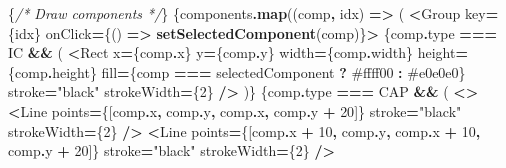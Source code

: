 \documentclass[
]{article}
\newenvironment{Shaded}{\begin{snugshade}}{\end{snugshade}}
\newcommand{\AttributeTok}[1]{\textcolor[rgb]{0.13,0.29,0.53}{#1}}
\newcommand{\CommentTok}[1]{\textcolor[rgb]{0.56,0.35,0.01}{\textit{#1}}}
\newcommand{\DecValTok}[1]{\textcolor[rgb]{0.00,0.00,0.81}{#1}}
\newcommand{\FunctionTok}[1]{\textcolor[rgb]{0.13,0.29,0.53}{\textbf{#1}}}
\newcommand{\KeywordTok}[1]{\textcolor[rgb]{0.13,0.29,0.53}{\textbf{#1}}}
\newcommand{\NormalTok}[1]{#1}
\newcommand{\OperatorTok}[1]{\textcolor[rgb]{0.81,0.36,0.00}{\textbf{#1}}}
\newcommand{\StringTok}[1]{\textcolor[rgb]{0.31,0.60,0.02}{#1}}
\begin{document}
\begin{Shaded}
\begin{Highlighting}[]
\NormalTok{          \{}\CommentTok{/* Draw components */}\NormalTok{\}}
\NormalTok{          \{components}\OperatorTok{.}\FunctionTok{map}\NormalTok{((comp}\OperatorTok{,}\NormalTok{ idx) }\KeywordTok{=\textgreater{}}\NormalTok{ (}
            \OperatorTok{\textless{}}\NormalTok{Group key}\OperatorTok{=}\NormalTok{\{idx\} onClick}\OperatorTok{=}\NormalTok{\{() }\KeywordTok{=\textgreater{}} \FunctionTok{setSelectedComponent}\NormalTok{(comp)\}}\OperatorTok{\textgreater{}}
\NormalTok{              \{comp}\OperatorTok{.}\AttributeTok{type} \OperatorTok{===} \StringTok{\textquotesingle{}IC\textquotesingle{}} \OperatorTok{\&\&}\NormalTok{ (}
                \OperatorTok{\textless{}}\NormalTok{Rect}
\NormalTok{                  x}\OperatorTok{=}\NormalTok{\{comp}\OperatorTok{.}\AttributeTok{x}\NormalTok{\}}
\NormalTok{                  y}\OperatorTok{=}\NormalTok{\{comp}\OperatorTok{.}\AttributeTok{y}\NormalTok{\}}
\NormalTok{                  width}\OperatorTok{=}\NormalTok{\{comp}\OperatorTok{.}\AttributeTok{width}\NormalTok{\}}
\NormalTok{                  height}\OperatorTok{=}\NormalTok{\{comp}\OperatorTok{.}\AttributeTok{height}\NormalTok{\}}
\NormalTok{                  fill}\OperatorTok{=}\NormalTok{\{comp }\OperatorTok{===}\NormalTok{ selectedComponent }\OperatorTok{?} \StringTok{\textquotesingle{}\#ffff00\textquotesingle{}} \OperatorTok{:} \StringTok{\textquotesingle{}\#e0e0e0\textquotesingle{}}\NormalTok{\}}
\NormalTok{                  stroke}\OperatorTok{=}\StringTok{"black"}
\NormalTok{                  strokeWidth}\OperatorTok{=}\NormalTok{\{}\DecValTok{2}\NormalTok{\}}
                \OperatorTok{/\textgreater{}}
\NormalTok{              )\}}
\NormalTok{              \{comp}\OperatorTok{.}\AttributeTok{type} \OperatorTok{===} \StringTok{\textquotesingle{}CAP\textquotesingle{}} \OperatorTok{\&\&}\NormalTok{ (}
                \OperatorTok{\textless{}\textgreater{}}
                  \OperatorTok{\textless{}}\NormalTok{Line points}\OperatorTok{=}\NormalTok{\{[comp}\OperatorTok{.}\AttributeTok{x}\OperatorTok{,}\NormalTok{ comp}\OperatorTok{.}\AttributeTok{y}\OperatorTok{,}\NormalTok{ comp}\OperatorTok{.}\AttributeTok{x}\OperatorTok{,}\NormalTok{ comp}\OperatorTok{.}\AttributeTok{y} \OperatorTok{+} \DecValTok{20}\NormalTok{]\} stroke}\OperatorTok{=}\StringTok{"black"}\NormalTok{ strokeWidth}\OperatorTok{=}\NormalTok{\{}\DecValTok{2}\NormalTok{\} }\OperatorTok{/\textgreater{}}
                  \OperatorTok{\textless{}}\NormalTok{Line points}\OperatorTok{=}\NormalTok{\{[comp}\OperatorTok{.}\AttributeTok{x} \OperatorTok{+} \DecValTok{10}\OperatorTok{,}\NormalTok{ comp}\OperatorTok{.}\AttributeTok{y}\OperatorTok{,}\NormalTok{ comp}\OperatorTok{.}\AttributeTok{x} \OperatorTok{+} \DecValTok{10}\OperatorTok{,}\NormalTok{ comp}\OperatorTok{.}\AttributeTok{y} \OperatorTok{+} \DecValTok{20}\NormalTok{]\} stroke}\OperatorTok{=}\StringTok{"black"}\NormalTok{ strokeWidth}\OperatorTok{=}\NormalTok{\{}\DecValTok{2}\NormalTok{\} }\OperatorTok{/\textgreater{}}

\end{Highlighting}
\end{Shaded}
\end{document}
